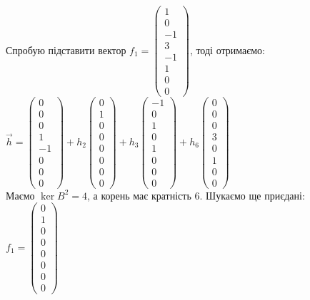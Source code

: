 \documentclass[a4paper, 10pt]{article}
\theoremstyle{theoremdd}
\begin{document}
Спробую підставити вектор $f_1 = \begin{pmatrix}
1 \\ 0 \\ -1 \\ 3 \\ -1 \\ 1 \\ 0 \\ 0
\end{pmatrix}$, тоді отримаємо:\\
$\vec{h} = \begin{pmatrix}
0 \\ 0 \\ 0 \\ 1 \\ -1 \\ 0 \\ 0 \\ 0
\end{pmatrix} + h_2 \begin{pmatrix}
0 \\ 1 \\ 0 \\ 0 \\ 0 \\ 0 \\ 0 \\ 0
\end{pmatrix} + h_3 \begin{pmatrix}
-1 \\ 0 \\ 1 \\ 0 \\ 1 \\ 0 \\ 0 \\ 0
\end{pmatrix} + h_6 \begin{pmatrix}
0 \\ 0 \\ 0 \\ 3 \\ 0 \\ 1 \\ 0 \\ 0
\end{pmatrix}$\\
Маємо $\ker B^2 = 4$, а корень має кратність 6. Шукаємо ще приєдані:
\bigskip \\
$f_1 = \begin{pmatrix}
0 \\ 1 \\ 0 \\ 0 \\ 0 \\ 0 \\ 0 \\ 0
\end{pmatrix}$\\
\end{document}
